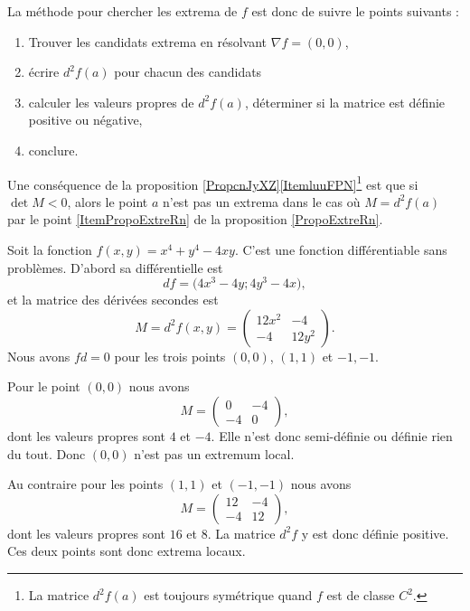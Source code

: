 La méthode pour chercher les extrema de $f$ est donc de suivre le points suivants :
\begin{enumerate}
    \item
        Trouver les candidats extrema en résolvant $\nabla f=(0,0)$,
    \item
        écrire $d^2f(a)$ pour chacun des candidats
    \item
        calculer les valeurs propres de $d^2f(a)$, déterminer si la matrice est définie positive ou négative,
    \item
        conclure.
\end{enumerate}

Une conséquence de la proposition \ref{PropcnJyXZ}\ref{ItemluuFPN}\footnote{La matrice $d^2f(a)$ est toujours symétrique quand $f$ est de classe $C^2$.} est que si \( \det M<0\), alors le point \( a\) n'est pas  un extrema dans le cas où $M=d^2f(a)$ par le point \ref{ItemPropoExtreRn} de la proposition \ref{PropoExtreRn}.

\begin{example}
    Soit la fonction \( f(x,y)=x^4+y^4-4xy\). C'est une fonction différentiable sans problèmes. D'abord sa différentielle est
    \begin{equation}
        df=\big(4x^3-4y;4y^3-4x),
    \end{equation}
    et la matrice des dérivées secondes est
    \begin{equation}
        M=d^2f(x,y)=\begin{pmatrix}
            12x^2    &   -4    \\ 
            -4    &   12y^2    
        \end{pmatrix}.
    \end{equation}
    Nous avons \( fd=0\) pour les trois points \( (0,0)\), \( (1,1)\) et \( -1,-1\).

    Pour le point \( (0,0)\) nous avons
    \begin{equation}
        M=\begin{pmatrix}
            0    &   -4    \\ 
            -4    &   0    
        \end{pmatrix},
    \end{equation}
    dont les valeurs propres sont \( 4\) et \( -4\). Elle n'est donc semi-définie ou définie rien du tout. Donc \( (0,0)\) n'est pas un extremum local.

    Au contraire pour les points \( (1,1)\) et \( (-1,-1)\) nous avons
    \begin{equation}
        M=\begin{pmatrix}
            12    &   -4    \\ 
            -4    &   12    
        \end{pmatrix},
    \end{equation}
    dont les valeurs propres sont \( 16\) et \( 8\). La matrice \( d^2f\) y est donc définie positive. Ces deux points sont donc extrema locaux.
\end{example}


